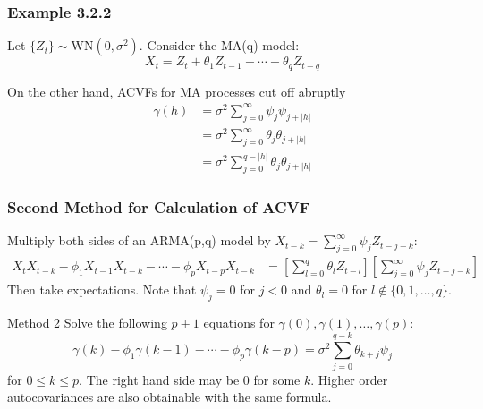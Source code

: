 \documentclass{beamer}
\begin{document}
\begin{frame}
\frametitle{Example 3.2.2}

Let $\{Z_t\} \sim \text{WN}(0, \sigma^2)$. Consider the MA(q) model:
\[
X_t = Z_t + \theta_1 Z_{t-1} + \cdots + \theta_q Z_{t-q}
\]

On the other hand, ACVFs for MA processes cut off abruptly
\begin{align*}
\gamma(h) &= \sigma^2\sum_{j=0}^{\infty} \psi_j \psi_{j+|h|} \\
&= \sigma^2\sum_{j=0}^{\infty} \theta_j\theta_{j+|h|} \\
&= \sigma^2 \sum_{j=0}^{q - |h|}\theta_j\theta_{j+|h|}
\end{align*}

\end{frame}


\begin{frame}
\frametitle{Second Method for Calculation of ACVF}

Multiply both sides of an ARMA(p,q) model by $X_{t-k} = \sum_{j=0}^{\infty}\psi_j Z_{t-j-k}$:
\begin{align*}
X_t X_{t-k} - \phi_1 X_{t-1}X_{t-k} - \cdots - \phi_pX_{t-p}X_{t-k} &= \left[\sum_{l=0}^q \theta_l Z_{t-l}\right]\left[\sum_{j=0}^{\infty}\psi_j Z_{t-j-k} \right]
\end{align*}
Then take expectations. Note that $\psi_j = 0$ for $j < 0$ and $\theta_l = 0$ for $l \not \in \{0,1,\ldots,q\}$. 
\begin{block}{Method 2}
Solve the following $p+1$ equations for $\gamma(0), \gamma(1), \ldots, \gamma(p)$:
\[
\gamma(k) - \phi_1 \gamma(k-1) - \cdots - \phi_p\gamma(k-p) = \sigma^2 \sum_{j=0}^{q-k}\theta_{k+j}\psi_j
\]
for $0 \le k \le p$. The right hand side may be $0$ for some $k$. Higher order autocovariances are also obtainable with the same formula.

\end{block}
\end{frame}

% 
% 
% 
\end{document}
